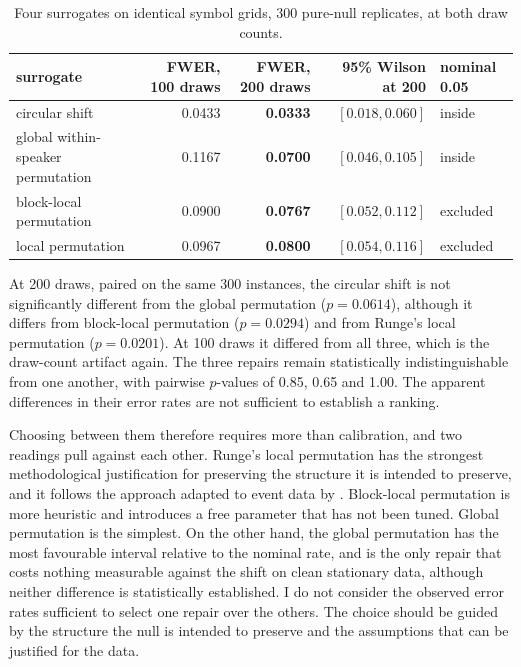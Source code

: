 \documentclass[10pt]{article}
\begin{document}
\begin{table}[h]
\centering
\begin{tabular}{lrrrl}
\toprule
surrogate & FWER, 100 draws & FWER, 200 draws & 95\% Wilson at 200 & nominal 0.05 \\
\midrule
circular shift                   & 0.0433 & \textbf{0.0333} & $[0.018, 0.060]$ & inside \\
global within-speaker permutation & 0.1167 & \textbf{0.0700} & $[0.046, 0.105]$ & inside \\
block-local permutation          & 0.0900 & \textbf{0.0767} & $[0.052, 0.112]$ & excluded \\
local permutation \citep{runge2018} & 0.0967 & \textbf{0.0800} & $[0.054, 0.116]$ & excluded \\
\bottomrule
\end{tabular}
\caption{Four surrogates on identical symbol grids, 300 pure-null replicates, at both draw counts.}
\end{table}

At 200 draws, paired on the same 300 instances, the circular shift is not significantly different
from the global permutation ($p = 0.0614$), although it differs from block-local permutation
($p = 0.0294$) and from Runge's local permutation ($p = 0.0201$). At 100 draws it differed from all
three, which is the draw-count artifact again. The three repairs remain statistically
indistinguishable from one another, with pairwise $p$-values of 0.85, 0.65 and 1.00. The apparent
differences in their error rates are not sufficient to establish a ranking.

Choosing between them therefore requires more than calibration, and two readings pull against each
other. Runge's local permutation has the strongest methodological justification for preserving the
structure it is intended to preserve, and it follows the approach adapted to event data by
\citet{shorten2021}. Block-local permutation is more heuristic and introduces a free parameter that
has not been tuned. Global permutation is the simplest. On the other hand, the global permutation has
the most favourable interval relative to the nominal rate, and is the only repair that costs nothing
measurable against the shift on clean stationary data, although neither difference is statistically
established. I do not consider the observed error rates sufficient to select one repair over the
others. The choice should be guided by the structure the null is intended to preserve and the
assumptions that can be justified for the data.
\end{document}

